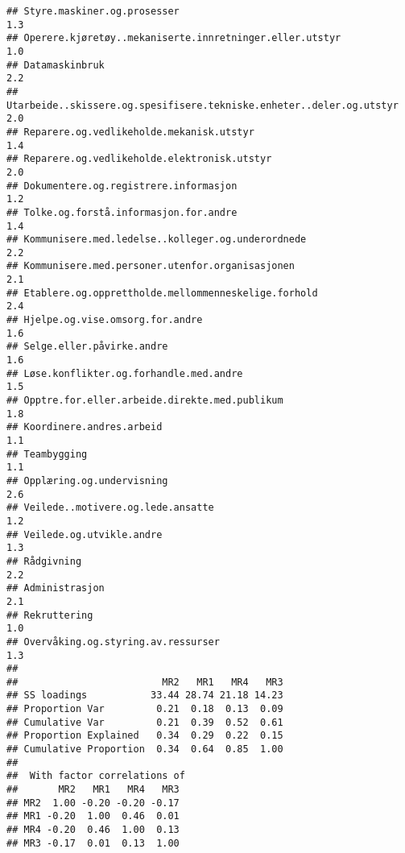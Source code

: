 \documentclass[
]{article}
\begin{document}
\begin{verbatim}
## Styre.maskiner.og.prosesser                                                      1.3
## Operere.kjøretøy..mekaniserte.innretninger.eller.utstyr                          1.0
## Datamaskinbruk                                                                   2.2
## Utarbeide..skissere.og.spesifisere.tekniske.enheter..deler.og.utstyr             2.0
## Reparere.og.vedlikeholde.mekanisk.utstyr                                         1.4
## Reparere.og.vedlikeholde.elektronisk.utstyr                                      2.0
## Dokumentere.og.registrere.informasjon                                            1.2
## Tolke.og.forstå.informasjon.for.andre                                            1.4
## Kommunisere.med.ledelse..kolleger.og.underordnede                                2.2
## Kommunisere.med.personer.utenfor.organisasjonen                                  2.1
## Etablere.og.opprettholde.mellommenneskelige.forhold                              2.4
## Hjelpe.og.vise.omsorg.for.andre                                                  1.6
## Selge.eller.påvirke.andre                                                        1.6
## Løse.konflikter.og.forhandle.med.andre                                           1.5
## Opptre.for.eller.arbeide.direkte.med.publikum                                    1.8
## Koordinere.andres.arbeid                                                         1.1
## Teambygging                                                                      1.1
## Opplæring.og.undervisning                                                        2.6
## Veilede..motivere.og.lede.ansatte                                                1.2
## Veilede.og.utvikle.andre                                                         1.3
## Rådgivning                                                                       2.2
## Administrasjon                                                                   2.1
## Rekruttering                                                                     1.0
## Overvåking.og.styring.av.ressurser                                               1.3
## 
##                         MR2   MR1   MR4   MR3
## SS loadings           33.44 28.74 21.18 14.23
## Proportion Var         0.21  0.18  0.13  0.09
## Cumulative Var         0.21  0.39  0.52  0.61
## Proportion Explained   0.34  0.29  0.22  0.15
## Cumulative Proportion  0.34  0.64  0.85  1.00
## 
##  With factor correlations of 
##       MR2   MR1   MR4   MR3
## MR2  1.00 -0.20 -0.20 -0.17
## MR1 -0.20  1.00  0.46  0.01
## MR4 -0.20  0.46  1.00  0.13
## MR3 -0.17  0.01  0.13  1.00

\end{verbatim}
\end{document}
